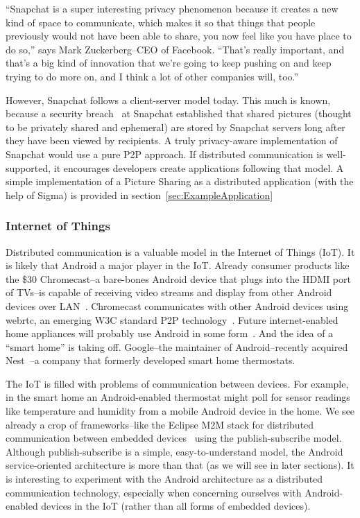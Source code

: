 \documentclass[prodmode]{acmlarge}
\begin{document}
``Snapchat is a super interesting privacy phenomenon because it creates a new kind of space to communicate, which makes it so that things that people previously would not have been able to share, you now feel like you have place to do so,'' says Mark Zuckerberg--CEO of Facebook. ``That's really important, and that's a big kind of innovation that we're going to keep pushing on and keep trying to do more on, and I think a lot of other companies will, too.''~\cite{Zuckerberg}

However, Snapchat follows a client-server model today. This much is known, because a security breach~\cite{SnapchatHack} at Snapchat established that shared pictures (thought to be privately shared and ephemeral) are stored by Snapchat servers long after they have been viewed by recipients. A truly privacy-aware implementation of Snapchat would use a pure P2P approach. If distributed communication is well-supported, it encourages developers create applications following that model. A simple implementation of a Picture Sharing as a distributed application (with the help of Sigma) is provided in section~\ref{sec:ExampleApplication}

\subsubsection{Internet of Things}
Distributed communication is a valuable model in the Internet of Things (IoT). It is likely that Android a major player in the IoT. Already consumer products like the \$30 Chromecast--a bare-bones Android device that plugs into the HDMI port of TVs--is capable of receiving video streams and display from other Android devices over LAN~\cite{chromecast}. Chromecast communicates with other Android devices using webrtc, an emerging W3C standard P2P technology~\cite{ChromecastWebrtc}. Future internet-enabled home appliances will probably use Android in some form~\cite{AndroidEverywhere}. And the idea of a ``smart home'' is taking off. Google--the maintainer of Android--recently acquired Nest~\cite{GoogleNest}--a company that formerly developed smart home thermostats.

The IoT is filled with problems of communication between devices. For example, in the smart home an Android-enabled thermostat might poll for sensor readings like temperature and humidity from a mobile Android device in the home. We see already a crop of frameworks--like the Eclipse M2M stack for distributed communication between embedded devices~\cite{eclipse_m2m} using the publish-subscribe model. Although publish-subscribe is a simple, easy-to-understand model, the Android service-oriented architecture is more than that (as we will see in later sections). It is interesting to experiment with the Android architecture as a distributed communication technology, especially when concerning ourselves with Android-enabled devices in the IoT (rather than all forms of embedded devices).
\end{document}
